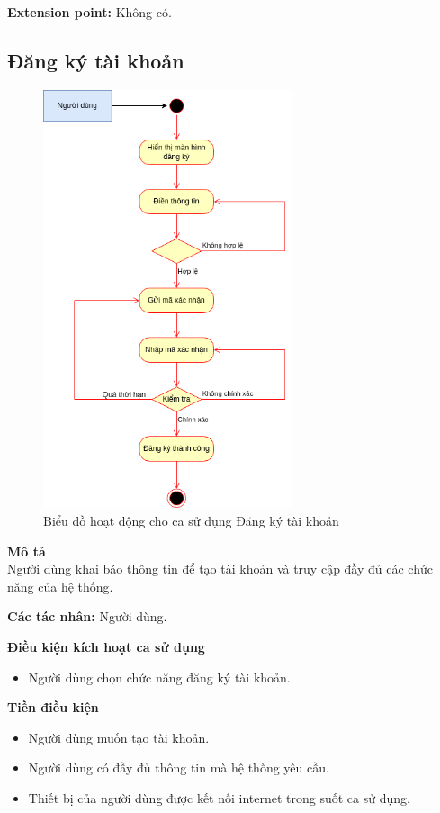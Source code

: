 \textbf{Extension point:} Không có.

\subsection{Đăng ký tài khoản}
\begin{figure}[H]
    \centering
    \includegraphics[width=0.65\textwidth]{img/Activity_graph-Đăng kí.drawio.png}
    \caption{Biểu đồ hoạt động cho ca sử dụng Đăng ký tài khoản}
\end{figure}
\textbf{\indent Mô tả}\\
\indent Người dùng khai báo thông tin để tạo tài khoản và truy cập đầy đủ các chức năng của hệ thống.

\textbf{Các tác nhân:} Người dùng.

\textbf{Điều kiện kích hoạt ca sử dụng}
\begin{itemize}
    \item Người dùng chọn chức năng đăng ký tài khoản.
\end{itemize}

\textbf{Tiền điều kiện}
\begin{itemize}
    \item Người dùng muốn tạo tài khoản.
    \item Người dùng có đầy đủ thông tin mà hệ thống yêu cầu.
    \item Thiết bị của người dùng được kết nối internet trong suốt ca sử dụng.
\end{itemize}

